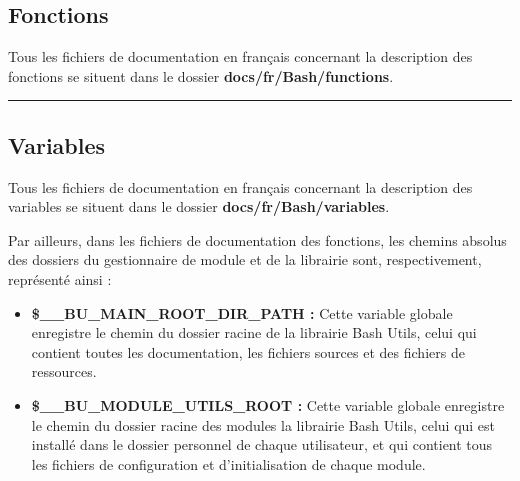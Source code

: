 \documentclass[a4paper,10pt]{article}
\begin{document}
    \color{sec2}
    \subsection{Fonctions}\color{text}

    \begin{justify}
        Tous les fichiers de documentation en français concernant la description des fonctions se situent dans le dossier \textbf{\color{path}docs/fr/Bash/functions}.
    \end{justify}




    \color{sec2}\par\noindent\rule{\textwidth}{0.4pt}\color{text}

    \color{sec2}
    \subsection{Variables}\color{text}

    \begin{justify}
        Tous les fichiers de documentation en français concernant la description des variables se situent dans le dossier \textbf{\color{path}docs/fr/Bash/variables}.
    \end{justify}


    \begin{justify}
        Par ailleurs, dans les fichiers de documentation des fonctions, les chemins absolus des dossiers du gestionnaire de module et de la librairie sont, respectivement, représenté ainsi :

        \begin{itemize}
            \item \textbf{\color{vars}\$\_\_BU\_MAIN\_ROOT\_DIR\_PATH\color{text} :} Cette variable globale enregistre le chemin du dossier racine de la librairie Bash Utils, celui qui contient toutes les documentation, les fichiers sources et des fichiers de ressources.\\\mbox{}

            \item \textbf{\color{vars}\$\_\_BU\_MODULE\_UTILS\_ROOT\color{text} :} Cette variable globale enregistre le chemin du dossier racine des modules la librairie Bash Utils, celui qui est installé dans le dossier personnel de chaque utilisateur, et qui contient tous les fichiers de configuration et d'initialisation de chaque module.
        \end{itemize}
    \end{justify}
\end{document}
